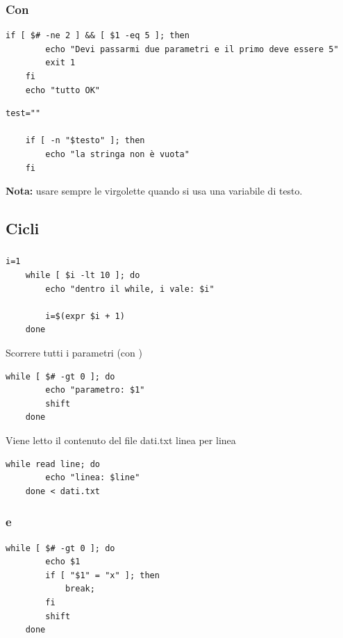 \documentclass[../main.tex]{subfiles}
\begin{document}
\vspace{0.25cm}
\subsubsection{Con }
\begin{lstlisting}[style=bash]
    if [ $# -ne 2 ] && [ $1 -eq 5 ]; then
        echo "Devi passarmi due parametri e il primo deve essere 5"
        exit 1
    fi
    echo "tutto OK"
\end{lstlisting}

\begin{lstlisting}[style=bash]
    test=""

    if [ -n "$testo" ]; then
        echo "la stringa non è vuota"
    fi
\end{lstlisting}
\textbf{Nota:} usare sempre le virgolette quando si usa una variabile di testo.

\pagebreak
\subsection{Cicli}
\subsubsection{}
\begin{lstlisting}[style=bash]
    i=1
    while [ $i -lt 10 ]; do
        echo "dentro il while, i vale: $i"

        i=$(expr $i + 1)
    done
\end{lstlisting}

\vspace{0.25cm}
Scorrere tutti i parametri (con )
\begin{lstlisting}[style=bash]
    while [ $# -gt 0 ]; do
        echo "parametro: $1"
        shift
    done
\end{lstlisting}

\vspace{0.25cm}
Viene letto il contenuto del file dati.txt linea per linea
\begin{lstlisting}[style=bash]
    while read line; do
        echo "linea: $line"
    done < dati.txt
\end{lstlisting}

\vspace{0.5cm}
\subsubsection{ e }
\begin{lstlisting}[style=bash]
    while [ $# -gt 0 ]; do
        echo $1
        if [ "$1" = "x" ]; then
            break;
        fi
        shift
    done
\end{lstlisting}
\end{document}
